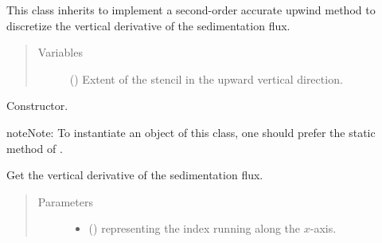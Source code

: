 \documentclass[letterpaper,10pt,english]{sphinxmanual}
\begin{document}
\begin{fulllineitems}
\label{\detokenize{api:tasmania.dycore.flux_sedimentation.FluxSedimentationUpwindSecondOrder}}
This class inherits  to implement a second-order
accurate upwind method to discretize the vertical derivative of the sedimentation flux.
\begin{quote}\begin{description}
\item[{Variables}] \leavevmode
{\hyperref[\detokenize{api:tasmania.dycore.prognostic_isentropic.PrognosticIsentropic.nb}]{}} () \textendash{} Extent of the stencil in the upward vertical direction.

\end{description}\end{quote}

\begin{fulllineitems}
\label{\detokenize{api:tasmania.dycore.flux_sedimentation.FluxSedimentationUpwindSecondOrder.__init__}}
Constructor.

\begin{sphinxadmonition}{note}{Note:}
To instantiate an object of this class, one should prefer the static method
 of
.
\end{sphinxadmonition}

\end{fulllineitems}


\begin{fulllineitems}
\label{\detokenize{api:tasmania.dycore.flux_sedimentation.FluxSedimentationUpwindSecondOrder.get_vertical_derivative_of_sedimentation_flux}}
Get the vertical derivative of the sedimentation flux.
\begin{quote}\begin{description}
\item[{Parameters}] \leavevmode\begin{itemize}
\item {} 
 () \textendash{}  representing the index running along the \(x\)-axis.


\end{itemize}
\end{description}
\end{quote}
\end{fulllineitems}
\end{fulllineitems}
\end{document}
